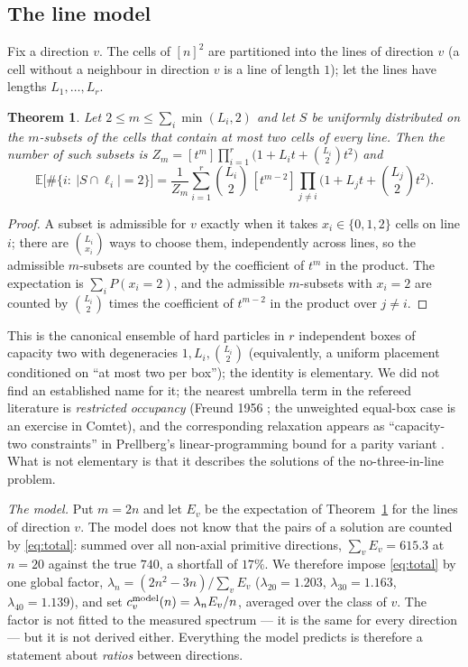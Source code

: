 \documentclass[11pt,a4paper]{article}
\newtheorem{theorem}{Theorem}[section]
\begin{document}
\subsection{The line model}\label{s:model}
Fix a direction $v$.  The cells of $[n]^2$ are partitioned into the lines of direction $v$ (a cell without a
neighbour in direction $v$ is a line of length $1$); let the lines have lengths $L_1,\dots,L_r$.

\begin{theorem}\label{thm:gf}
Let $2\le m\le\sum_i\min(L_i,2)$ and let $S$ be uniformly distributed on the $m$-subsets of the cells that contain at
most two cells of every line.  Then the number of such subsets is $Z_m=[t^m]\prod_{i=1}^{r}\bigl(1+L_it+\binom{L_i}{2}t^2\bigr)$
and
\[\mathbb{E}\bigl[\#\{i:\ |S\cap\ell_i|=2\}\bigr]=\frac{1}{Z_m}\sum_{i=1}^{r}\binom{L_i}{2}\,[t^{m-2}]\prod_{j\ne i}\bigl(1+L_jt+\binom{L_j}{2}t^2\bigr).\]
\end{theorem}
\begin{proof}
A subset is admissible for $v$ exactly when it takes $x_i\in\{0,1,2\}$ cells on line $i$; there are $\binom{L_i}{x_i}$
ways to choose them, independently across lines, so the admissible $m$-subsets are counted by the coefficient of $t^m$
in the product.  The expectation is $\sum_iP(x_i=2)$, and the admissible $m$-subsets with $x_i=2$ are counted by
$\binom{L_i}{2}$ times the coefficient of $t^{m-2}$ in the product over $j\ne i$.
\end{proof}

This is the canonical ensemble of hard particles in $r$ independent boxes of capacity two with degeneracies
$1,L_i,\binom{L_i}{2}$ (equivalently, a uniform placement conditioned on ``at most two per box''); the identity is
elementary.  We did not find an established name for it; the nearest umbrella term in the refereed literature is
\emph{restricted occupancy} (Freund 1956 \cite{Freund}; the unweighted equal-box case is an exercise in Comtet),
and the corresponding relaxation appears as ``capacity-two constraints'' in Prellberg's linear-programming bound for a
parity variant \cite{PrellbergCB}.  What is not elementary is that it describes the solutions of the no-three-in-line problem.

\emph{The model.}  Put $m=2n$ and let $E_v$ be the expectation of Theorem~\ref{thm:gf} for the lines of direction $v$.
The model does not know that the pairs of a solution are counted by \eqref{eq:total}: summed over all non-axial
primitive directions, $\sum_vE_v=615.3$ at $n=20$ against the true $740$, a shortfall of $17\%$.  We therefore
impose \eqref{eq:total} by one global factor, $\lambda_n=(2n^2-3n)/\sum_vE_v$ ($\lambda_{20}=1.203$, $\lambda_{30}=1.163$,
$\lambda_{40}=1.139$), and set $c^{\rm model}_v(n)=\lambda_nE_v/n$, averaged over the class of $v$.  The factor is not fitted to
the measured spectrum --- it is the same for every direction --- but it is not derived either.  Everything the model
predicts is therefore a statement about \emph{ratios} between directions.
\end{document}
